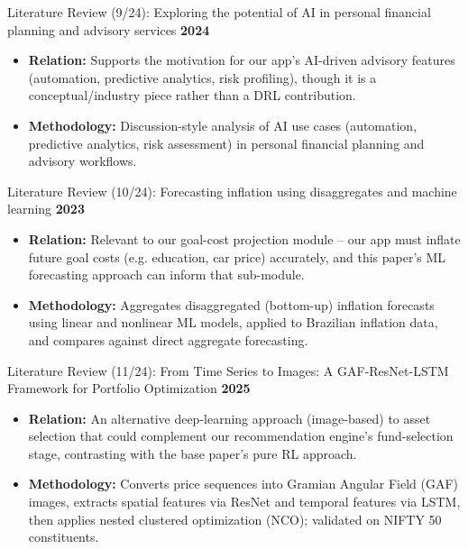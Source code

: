\documentclass{beamer}
\begin{document}
\begin{frame}{Literature Review (9/24): Exploring the potential of AI in personal financial planning and advisory services}
\small
\textbf{2024}
\begin{itemize}
    \item \textbf{Relation:} Supports the motivation for our app's AI-driven advisory features (automation, predictive analytics, risk profiling), though it is a conceptual/industry piece rather than a DRL contribution.
    \item \textbf{Methodology:} Discussion-style analysis of AI use cases (automation, predictive analytics, risk assessment) in personal financial planning and advisory workflows.
\end{itemize}
\end{frame}

\begin{frame}{Literature Review (10/24): Forecasting inflation using disaggregates and machine learning}
\small
\textbf{2023}
\begin{itemize}
    \item \textbf{Relation:} Relevant to our goal-cost projection module -- our app must inflate future goal costs (e.g. education, car price) accurately, and this paper's ML forecasting approach can inform that sub-module.
    \item \textbf{Methodology:} Aggregates disaggregated (bottom-up) inflation forecasts using linear and nonlinear ML models, applied to Brazilian inflation data, and compares against direct aggregate forecasting.
\end{itemize}
\end{frame}

\begin{frame}{Literature Review (11/24): From Time Series to Images: A GAF-ResNet-LSTM Framework for Portfolio Optimization}
\small
\textbf{2025}
\begin{itemize}
    \item \textbf{Relation:} An alternative deep-learning approach (image-based) to asset selection that could complement our recommendation engine's fund-selection stage, contrasting with the base paper's pure RL approach.
    \item \textbf{Methodology:} Converts price sequences into Gramian Angular Field (GAF) images, extracts spatial features via ResNet and temporal features via LSTM, then applies nested clustered optimization (NCO); validated on NIFTY 50 constituents.
\end{itemize}
\end{frame}
\end{document}
